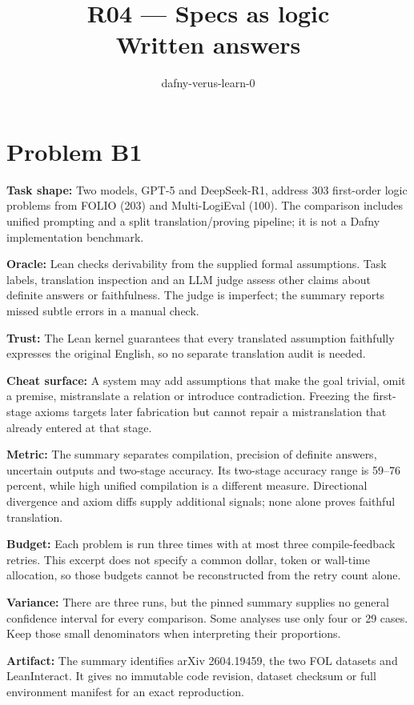 \documentclass[11pt]{article}
\title{R04 --- Specs as logic \\ \large Written answers}
\author{dafny-verus-learn-0}
\date{}
\begin{document}
\maketitle
\section*{Problem B1}\label{ans:B1}
\begin{answer}
\textbf{Task shape:} Two models, GPT-5 and DeepSeek-R1, address 303 first-order logic problems from FOLIO (203) and Multi-LogiEval (100). The comparison includes unified prompting and a split translation/proving pipeline; it is not a Dafny implementation benchmark.

\textbf{Oracle:} Lean checks derivability from the supplied formal assumptions. Task labels, translation inspection and an LLM judge assess other claims about definite answers or faithfulness. The judge is imperfect; the summary reports missed subtle errors in a manual check.

\textbf{Trust:} The Lean kernel guarantees that every translated assumption faithfully expresses the original English, so no separate translation audit is needed.

\textbf{Cheat surface:} A system may add assumptions that make the goal trivial, omit a premise, mistranslate a relation or introduce contradiction. Freezing the first-stage axioms targets later fabrication but cannot repair a mistranslation that already entered at that stage.

\textbf{Metric:} The summary separates compilation, precision of definite answers, uncertain outputs and two-stage accuracy. Its two-stage accuracy range is 59--76 percent, while high unified compilation is a different measure. Directional divergence and axiom diffs supply additional signals; none alone proves faithful translation.

\textbf{Budget:} Each problem is run three times with at most three compile-feedback retries. This excerpt does not specify a common dollar, token or wall-time allocation, so those budgets cannot be reconstructed from the retry count alone.

\textbf{Variance:} There are three runs, but the pinned summary supplies no general confidence interval for every comparison. Some analyses use only four or 29 cases. Keep those small denominators when interpreting their proportions.

\textbf{Artifact:} The summary identifies arXiv 2604.19459, the two FOL datasets and LeanInteract. It gives no immutable code revision, dataset checksum or full environment manifest for an exact reproduction.
\end{answer}
\end{document}
